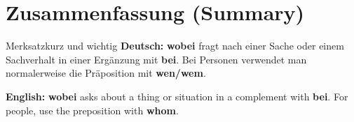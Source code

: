 \documentclass[a4paper,11pt]{article}
\newcommand{\GermanText}[1]{\textbf{Deutsch: }#1\par}
\newcommand{\EnglishText}[1]{{\small\color{SoftGray}\textbf{English: }#1\par}}
\begin{document}
\section{Zusammenfassung (Summary)}
\begin{grammarentry}{Merksatz}{kurz und wichtig}
\GermanText{\textbf{wobei} fragt nach einer Sache oder einem Sachverhalt in einer Ergänzung mit \textbf{bei}. Bei Personen verwendet man normalerweise die Präposition mit \textbf{wen/wem}.}
\EnglishText{\textbf{wobei} asks about a thing or situation in a complement with \textbf{bei}. For people, use the preposition with \textbf{whom}.}
\end{grammarentry}
\end{document}

